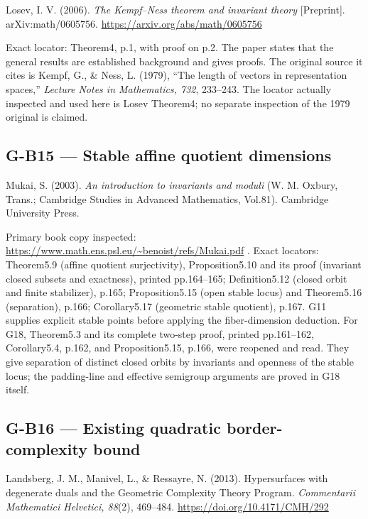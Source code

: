 \documentclass[11pt,a4paper]{article}
\theoremstyle{definition}\newtheorem{definition}{Definition}
\begin{document}
Losev, I. V. (2006). \emph{The Kempf--Ness theorem and invariant theory}
{[}Preprint{]}. arXiv:math/0605756.
\url{https://arxiv.org/abs/math/0605756}

Exact locator: Theorem4, p.1, with proof on p.2. The paper states that
the general results are established background and gives proofs. The
original source it cites is Kempf, G., \& Ness, L. (1979), ``The length
of vectors in representation spaces,'' \emph{Lecture Notes in
Mathematics, 732}, 233--243. The locator actually inspected and used
here is Losev Theorem4; no separate inspection of the 1979 original is
claimed.

\subsection{G-B15 --- Stable affine quotient
dimensions}\label{g-b15--stable-affine-quotient-dimensions}

Mukai, S. (2003). \emph{An introduction to invariants and moduli} (W. M.
Oxbury, Trans.; Cambridge Studies in Advanced Mathematics, Vol.81).
Cambridge University Press.

Primary book copy inspected:
\url{https://www.math.ens.psl.eu/~benoist/refs/Mukai.pdf} . Exact
locators: Theorem5.9 (affine quotient surjectivity), Proposition5.10 and
its proof (invariant closed subsets and exactness), printed pp.164--165;
Definition5.12 (closed orbit and finite stabilizer), p.165;
Proposition5.15 (open stable locus) and Theorem5.16 (separation), p.166;
Corollary5.17 (geometric stable quotient), p.167. G11 supplies explicit
stable points before applying the fiber-dimension deduction. For G18,
Theorem5.3 and its complete two-step proof, printed pp.161--162,
Corollary5.4, p.162, and Proposition5.15, p.166, were reopened and read.
They give separation of distinct closed orbits by invariants and
openness of the stable locus; the padding-line and effective semigroup
arguments are proved in G18 itself.

\subsection{G-B16 --- Existing quadratic border-complexity
bound}\label{g-b16--existing-quadratic-border-complexity-bound}

Landsberg, J. M., Manivel, L., \& Ressayre, N. (2013). Hypersurfaces
with degenerate duals and the Geometric Complexity Theory Program.
\emph{Commentarii Mathematici Helvetici, 88}(2), 469--484.
\url{https://doi.org/10.4171/CMH/292}
\end{document}
